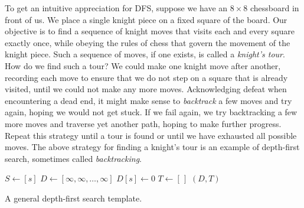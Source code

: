 To get an intuitive appreciation for DFS, suppose we have an
$8 \times 8$ chessboard in front of us. We place a single knight
piece on a fixed square of the board. Our objective is to find a
sequence of knight moves that visits each and every square exactly
once, while obeying the rules of chess that govern the movement of the
knight piece. Such a sequence of moves, if one exists, is called a
\emph{knight's tour}. How do we find such a tour? We could make one
knight move after another, recording each move to ensure that we do
not step on a square that is already visited, until we could not make
any more moves. Acknowledging defeat when encountering a dead end, it
might make sense to \emph{backtrack} a few moves and try again, hoping
we would not get stuck. If we fail again, we try backtracking a few
more moves and traverse yet another path, hoping to make further
progress. Repeat this strategy until a tour is found or until we have
exhausted all possible moves. The above strategy for finding a
knight's tour is an example of depth-first search, sometimes called
\emph{backtracking}.

\begin{algorithm}[!htpb]
\dontprintsemicolon  %
\BlankLine
$S \leftarrow [s]$ \;
$D \leftarrow [\infty, \infty, \dots, \infty]$ \;
$D[s] \leftarrow 0$\;
$T \leftarrow [\,]$\;
\Return $(D, T)$\;
\caption{A general depth-first search template.}
\label{alg:graph_algorithms:depth_first_search_template}
\end{algorithm}

